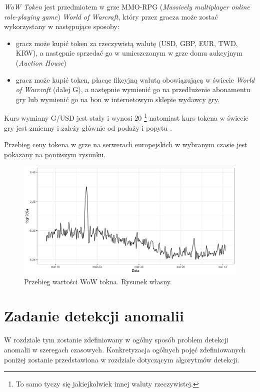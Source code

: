 \documentclass{article}
\begin{document}
\emph{WoW Token} jest przedmiotem w grze MMO-RPG (\emph{Massively
multiplayer online role-playing game}) \emph{World of Warcraft}, który
przez gracza może zostać wykorzystany w następujące sposoby:

\begin{itemize}
\item
  gracz może kupić token za rzeczywistą walutę (USD, GBP, EUR, TWD,
  KRW), a następnie sprzedać go w umieszczonym w grze domu aukcyjnym
  (\emph{Auction House})
\item
  gracz może kupić token, płacąc fikcyjną walutą obowiązującą w świecie
  \emph{World of Warcraft} (dalej G), a następnie wymienić go na
  przedłużenie abonamentu gry lub wymienić go na bon w internetowym
  sklepie wydawcy gry.
\end{itemize}

Kurs wymiany G/USD jest stały i wynosi $20$ \footnote{To samo tyczy
  się jakiejkolwiek innej waluty rzeczywistej.} natomiast kurs tokena w
świecie gry jest zmienny i zależy głównie od podaży i popytu
\cite{wtoken-info}.

Przebieg ceny tokena w grze na serwerach europejskich w wybranym czasie
jest pokazany na poniższym rysunku.

\begin{figure}
  \centering
  \includegraphics[width=\textwidth]{./images/wtoken-random.png}
  \caption{Przebieg wartości WoW tokna. Rysunek własny.}
\end{figure}

\section{Zadanie detekcji anomalii \label{r3}}

W rozdziale tym zostanie zdefiniowany w ogólny sposób problem detekcji
anomalii w szeregach czasowych. Konkretyzacja ogólnych pojęć
zdefiniowanych poniżej zostanie przedstawiona w rozdziale dotyczącym
algorytmów detekcji.
\end{document}
